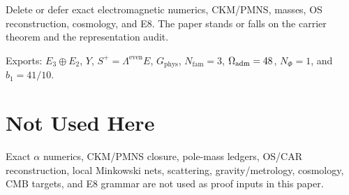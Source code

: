 \documentclass[11pt,a4paper]{article}
\begin{document}
\begin{tfptwarningbox}
Delete or defer exact electromagnetic numerics, CKM/PMNS, masses, OS reconstruction, cosmology, and
E8. The paper stands or falls on the carrier theorem and the representation audit.
\end{tfptwarningbox}


\begin{tfptexports}
Exports: $E_3\oplus E_2$, $Y$, $S^+=\Lambda^{\mathrm{even}}E$, $G_{\mathrm{phys}}$, $N_{\mathrm{fam}}=3$, $\Omega_{\mathrm{adm}}=48$, $N_\Phi=1$, and $b_1=41/10$.
\end{tfptexports}

\section{Not Used Here}

Exact $\alpha$ numerics, CKM/PMNS closure, pole-mass ledgers, OS/CAR reconstruction, local
Minkowski nets, scattering, gravity/metrology, cosmology, CMB targets, and E8 grammar are not used
as proof inputs in this paper.
\end{document}
